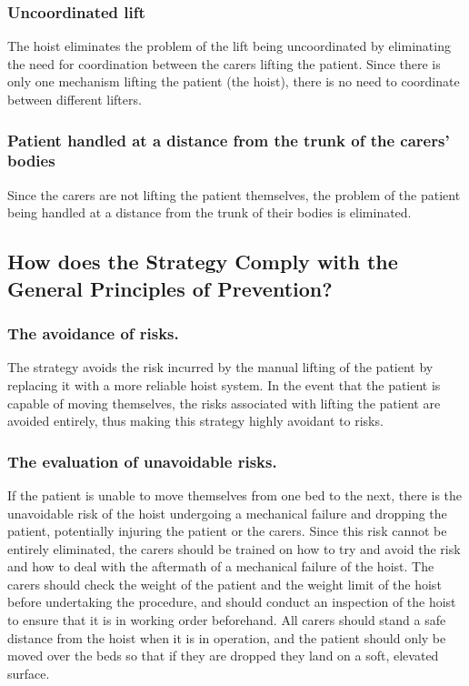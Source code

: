 \documentclass[a4paper]{article}
\begin{document}
\begin{multicols}{2}
\subsubsection{Uncoordinated lift}
The hoist eliminates the problem of the lift being uncoordinated by eliminating the need for coordination between the
carers lifting the patient. 
Since there is only one mechanism lifting the patient (the hoist), there is no need to coordinate between different
lifters.

\subsubsection{Patient handled at a distance from the trunk of the carers' bodies}
Since the carers are not lifting the patient themselves, the problem of the patient being handled at a distance from the
trunk of their bodies is eliminated.

\subsection{How does the Strategy Comply with the General Principles of Prevention?\supercite{isb}}
\subsubsection{The avoidance of risks.}
The strategy avoids the risk incurred by the manual lifting of the patient by replacing it with a more reliable hoist
system.
In the event that the patient is capable of moving themselves, the risks associated with lifting the patient are avoided
entirely, thus making this strategy highly avoidant to risks.

\subsubsection{The evaluation of unavoidable risks.}
If the patient is unable to move themselves from one bed to the next, there is the unavoidable risk of the hoist
undergoing a mechanical failure and dropping the patient, potentially injuring the patient or the carers.
Since this risk cannot be entirely eliminated, the carers should be trained on how to try and avoid the risk and how to
deal with the aftermath of a mechanical failure of the hoist.
The carers should check the weight of the patient and the weight limit of the hoist before undertaking the procedure,
and should conduct an inspection of the hoist to ensure that it is in working order beforehand.
All carers should stand a safe distance from the hoist when it is in operation, and the patient should only be moved
over the beds so that if they are dropped they land on a soft, elevated surface.


\end{multicols}
\end{document}

